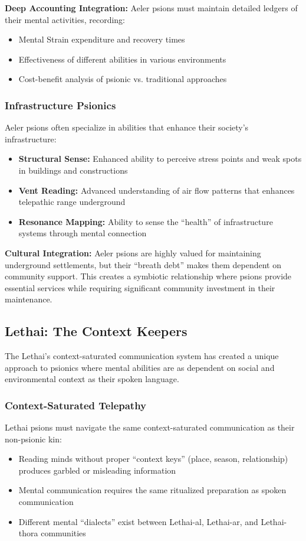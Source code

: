 \documentclass[11pt,twoside]{article}
\begin{document}
\textbf{Deep Accounting Integration:} Aeler psions must maintain detailed ledgers of their mental activities, recording:
\begin{itemize}
    \item Mental Strain expenditure and recovery times
    \item Effectiveness of different abilities in various environments
    \item Cost-benefit analysis of psionic vs. traditional approaches
\end{itemize}

\subsubsection{Infrastructure Psionics}
Aeler psions often specialize in abilities that enhance their society's infrastructure:
\begin{itemize}
    \item \textbf{Structural Sense:} Enhanced ability to perceive stress points and weak spots in buildings and constructions
    \item \textbf{Vent Reading:} Advanced understanding of air flow patterns that enhances telepathic range underground
    \item \textbf{Resonance Mapping:} Ability to sense the ``health'' of infrastructure systems through mental connection
\end{itemize}

\textbf{Cultural Integration:} Aeler psions are highly valued for maintaining underground settlements, but their ``breath debt'' makes them dependent on community support. This creates a symbiotic relationship where psions provide essential services while requiring significant community investment in their maintenance.

\subsection{Lethai: The Context Keepers}

The Lethai's context-saturated communication system has created a unique approach to psionics where mental abilities are as dependent on social and environmental context as their spoken language.

\subsubsection{Context-Saturated Telepathy}
Lethai psions must navigate the same context-saturated communication as their non-psionic kin:
\begin{itemize}
    \item Reading minds without proper ``context keys'' (place, season, relationship) produces garbled or misleading information
    \item Mental communication requires the same ritualized preparation as spoken communication
    \item Different mental ``dialects'' exist between Lethai-al, Lethai-ar, and Lethai-thora communities
\end{itemize}
\end{document}
